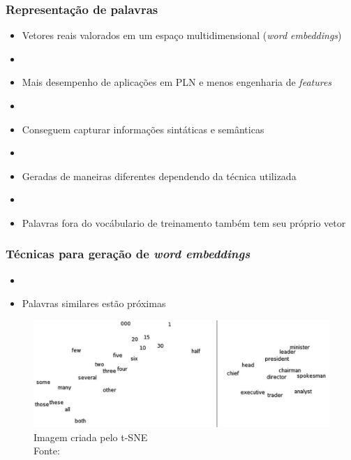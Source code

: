 \documentclass[10pt]{beamer}
\begin{document}
\begin{frame}[fragile]
  \frametitle{Representação de palavras}

  \begin{itemize}

    \item Vetores reais valorados em um espaço multidimensional (\textit{word embeddings})
    
    \item[\ ] \ 

    \item Mais desempenho de aplicações em PLN e menos engenharia de \textit{features}

    \item[\ ] \ 

    \item Conseguem capturar informações sintáticas e semânticas

    \item[\ ] \ 

    \item Geradas de maneiras diferentes dependendo da técnica utilizada


    \item[\ ] \ 

    \item Palavras fora do vocábulario de treinamento também tem seu próprio vetor


  \end{itemize}
  


\end{frame}



\begin{frame}[fragile]
  \frametitle{Técnicas para geração de \protect\textit{word embeddings}}

   \begin{itemize}
    \item[\ ] \
    \item Palavras similares estão próximas
     
  \end{itemize}

  \begin{figure}[htb]
	  \begin{center}
	      \includegraphics[scale=0.18]{img/Turian-WordTSNE}
	  \end{center}
	  \caption{Imagem criada pelo t-SNE\\Fonte: }

	\end{figure}
\end{frame}
\end{document}
